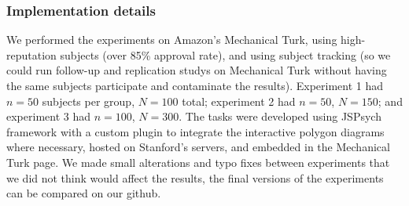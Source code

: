 \documentclass[man,10pt]{apa6}
\begin{document}
\subsubsection{Implementation details}
We performed the experiments on Amazon's Mechanical Turk, using high-reputation subjects (over 85\% approval rate), and using subject tracking (so we could run follow-up and replication studys on Mechanical Turk without having the same subjects participate and contaminate the results). Experiment 1 had $n = 50$ subjects per group, $N = 100$ total; experiment 2 had $n = 50$, $N = 150$; and experiment 3 had $n = 100$, $N = 300$. The tasks were developed using JSPsych framework with a custom plugin to integrate the interactive polygon diagrams where necessary, hosted on Stanford's servers, and embedded in the Mechanical Turk page. We made small alterations and typo fixes between experiments that we did not think would affect the results, the final versions of the experiments can be compared on our github. 
\end{document}

